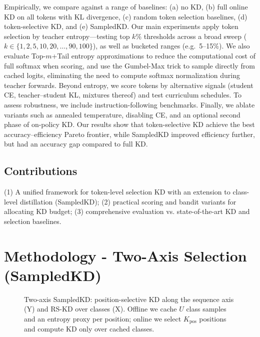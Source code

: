 \documentclass[11pt]{article}
\begin{document}
Empirically, we compare against a range of baselines: (a) no KD, (b) full online KD on all tokens with KL divergence, (c) random token selection baselines, (d) token-selective KD, and (e) SampledKD.
Our main experiments apply token selection by teacher entropy---testing top $k\%$ thresholds across a broad sweep ($k \in \{1,2,5,10,20,\ldots,90,100\}$), as well as bucketed ranges (e.g.\ 5--15\%).
We also evaluate Top-$m$+Tail entropy approximations to reduce the computational cost of full softmax when scoring, and use the Gumbel-Max trick to sample directly from cached logits, eliminating the need to compute softmax normalization during teacher forwards.
Beyond entropy, we score tokens by alternative signals (student CE, teacher--student KL, mixtures thereof) and test curriculum schedules.
To assess robustness, we include instruction-following benchmarks.
Finally, we ablate variants such as annealed temperature, disabling CE, and an optional second phase of on-policy KD.
Our results show that token-selective KD achieve the best accuracy--efficiency Pareto frontier, while SampledKD improved efficiency further, but had an accuracy gap compared to full KD.

\subsection{Contributions}
(1) A unified framework for token-level selection KD with an extension to class-level distillation (SampledKD);
(2) practical scoring and bandit variants for allocating KD budget;
(3) comprehensive evaluation vs. state-of-the-art KD and selection baselines.


\section{Methodology - Two-Axis Selection (SampledKD)}

\FloatBarrier

\label{sec:twoaxis}
\begin{figure}[h!]
	\centering
	\resizebox{\columnwidth}{!}{}
	\resizebox{\columnwidth}{!}{}
	\caption{Two-axis SampledKD: position-selective KD along the sequence axis (Y) and RS-KD over classes (X). Offline we cache $U$ class samples and an entropy proxy per position; online we select $K_{\text{pos}}$ positions and compute KD only over cached classes.}
	\label{fig:two-axis}
\end{figure}
\end{document}
